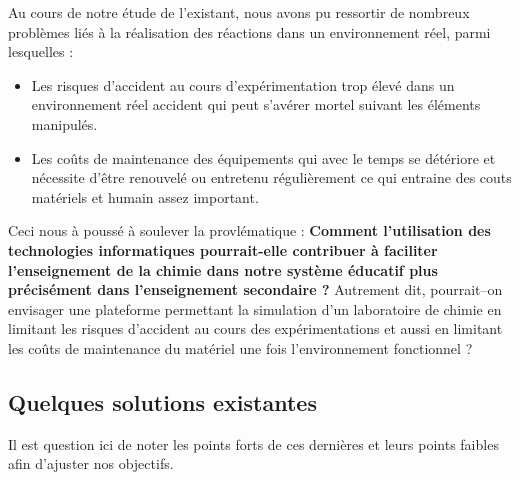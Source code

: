 Au cours de notre étude de l’existant, nous avons pu ressortir de nombreux problèmes liés à la réalisation des réactions dans un environnement réel, parmi lesquelles :

\begin{itemize}
	\item Les risques d’accident au cours d’expérimentation trop élevé dans un environnement réel accident qui peut s’avérer mortel suivant les éléments manipulés.
	\item Les coûts de maintenance des équipements qui avec le temps se détériore et nécessite d’être renouvelé ou entretenu régulièrement ce qui entraine des couts matériels et humain assez important.
\end{itemize}

Ceci nous à poussé à soulever la provlématique : \textbf{\og Comment l’utilisation des technologies informatiques pourrait-elle contribuer à faciliter l’enseignement de la chimie dans notre système éducatif plus précisément dans l’enseignement secondaire ? \fg} Autrement dit, pourrait–on envisager une plateforme permettant la simulation d’un laboratoire de chimie en limitant les risques d’accident au cours des expérimentations et aussi en limitant les coûts de maintenance du matériel une fois l'environnement fonctionnel ?

\subsection{Quelques solutions existantes}

Il est question ici de noter les points forts de ces dernières et leurs points faibles afin d’ajuster nos objectifs.

